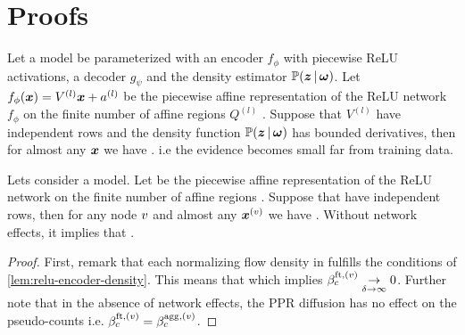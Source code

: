 \section{Proofs} 
\label{sec:proofs_009}

\begin{lemma}
\label{lem:relu-encoder-density}
\cite{NatPN2021} Let a model be parameterized with an encoder $f_{\phi}$ with piecewise ReLU activations, a decoder $g_{\psi}$ and the density estimator $\mathbb{P}(\bm{z} \,|\, \bm{\omega})$. Let $f_{\phi}(\bm{x})= V^{(l)}\bm{x} + a^{(l)}$ be the piecewise affine representation of the ReLU network $f_{\phi}$ on the finite number of affine regions $Q^{(l)}$ \cite{understanding-nn-relu}. Suppose that $V^{(l)}$ have independent rows and the density function $\mathbb{P}(\bm{z} \,|\, \bm{\omega})$ has bounded derivatives, then for almost any $\bm{x}$ we have . i.e the evidence becomes small far from training data.
\end{lemma}

\begin{theorem}
\label{thm:axiom-feature-proof}
Lets consider a \GPNacro{} model. Let  be the piecewise affine representation of the ReLU network  on the finite number of affine regions  \cite{understanding-nn-relu}. Suppose that  have independent rows, then for any node $v$ and almost any $\bm{x}^{(v)}$ we have . Without network effects, it implies that .
\end{theorem}

\begin{proof}
First, remark that each normalizing flow density in \GPNacro{} fulfills the conditions of \cref{lem:relu-encoder-density}. This means that  which implies $\beta_c^{\text{ft}, (v)} \underset{\delta \rightarrow \infty}{\rightarrow} 0$. Further note that in the absence of network effects, the PPR diffusion has no effect on the pseudo-counts i.e. $\beta_c^{\text{ft}, (v)} = \beta_c^{\text{agg}, (v)}$.
\end{proof}

